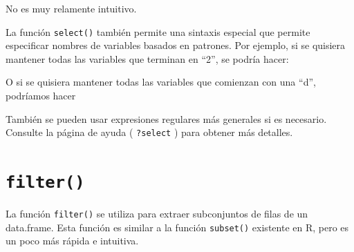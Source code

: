 \documentclass[
]{book}
\newenvironment{Shaded}{\begin{snugshade}}{\end{snugshade}}
\newcommand{\DocumentationTok}[1]{\textcolor[rgb]{0.56,0.35,0.01}{\textbf{\textit{#1}}}}
\newcommand{\FunctionTok}[1]{\textcolor[rgb]{0.00,0.00,0.00}{#1}}
\newcommand{\NormalTok}[1]{#1}
\newcommand{\OtherTok}[1]{\textcolor[rgb]{0.56,0.35,0.01}{#1}}
\newcommand{\StringTok}[1]{\textcolor[rgb]{0.31,0.60,0.02}{#1}}
\begin{document}
No es muy relamente intuitivo.

La función \texttt{select()} también permite una sintaxis especial que permite especificar nombres de variables basados en patrones. Por ejemplo, si se quisiera mantener todas las variables que terminan en ``2'', se podría hacer:

\begin{Shaded}
\end{Shaded}

O si se quisiera mantener todas las variables que comienzan con una ``d'', podríamos hacer

\begin{Shaded}
\end{Shaded}

También se pueden usar expresiones regulares más generales si es necesario. Consulte la página de ayuda ( \texttt{?select} ) para obtener más detalles.

\hypertarget{filter}{%
\section{\texorpdfstring{\texttt{filter()}}{filter()}}\label{filter}}

La función \texttt{filter()} se utiliza para extraer subconjuntos de filas de un data.frame. Esta función es similar a la función \texttt{subset()} existente en R, pero es un poco más rápida e intuitiva.
\end{document}

